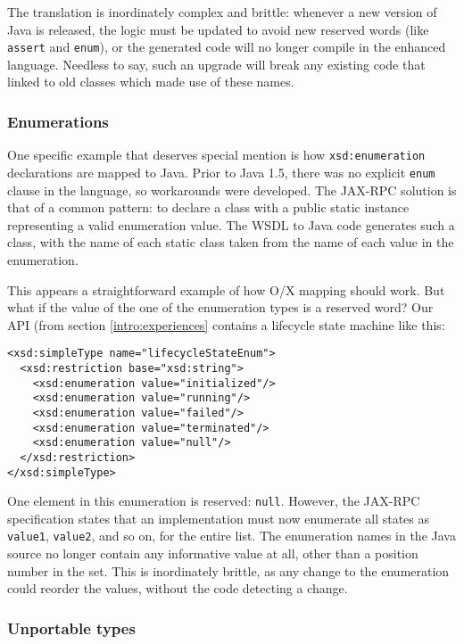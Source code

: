 The translation is inordinately complex and brittle: whenever a new
version of Java is released, the logic must be updated to avoid new
reserved words (like {\tt assert} and {\tt enum}), or the generated
code will no longer compile in the enhanced language. Needless to say,
such an upgrade will break any existing code that linked to old
classes which made use of these names.

\subsubsection{Enumerations}
\label{objections:o-x:enum}

One specific example that deserves special mention is how
{\tt xsd:enumeration} declarations are mapped to Java. Prior to
Java 1.5, there was no explicit {\tt enum} clause in the language, so
workarounds were developed. The JAX-RPC solution is that of a common
pattern: to declare a class with a public static instance representing
a valid enumeration value. The WSDL to Java code generates such a
class, with the name of each static class taken from the name of each
value in the enumeration. 

This appears a straightforward example of how O/X mapping should
work. But what if the value of the one of the enumeration types is a
reserved word?  Our API (from section \ref{intro:experiences} contains
a lifecycle state machine like this:

\begin{verbatim}
<xsd:simpleType name="lifecycleStateEnum">
  <xsd:restriction base="xsd:string"> 
    <xsd:enumeration value="initialized"/> 
    <xsd:enumeration value="running"/> 
    <xsd:enumeration value="failed"/> 
    <xsd:enumeration value="terminated"/> 
    <xsd:enumeration value="null"/> 
  </xsd:restriction>
</xsd:simpleType>
\end{verbatim}

One element in this enumeration is reserved: {\tt null}. However, the
JAX-RPC specification states that an implementation must now enumerate
all states as {\tt value1}, {\tt value2}, and so on, for the entire
list.  The enumeration names in the Java source no longer contain any
informative value at all, other than a position number in the
set. This is inordinately brittle, as any change to the enumeration
could reorder the values, without the code detecting a change.

\subsubsection{Unportable types}
\label{objections:o-x:types}

